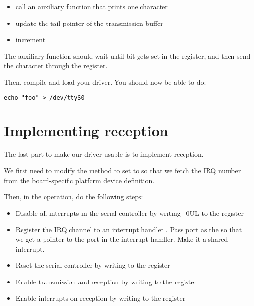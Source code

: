 \begin{itemize}
\item call an auxiliary function that prints one character
\item update the tail pointer of the transmission buffer
\item increment 
\end{itemize}

The auxiliary function should wait until bit 
gets set in the  register, and then send the
character through the  register.

Then, compile and load your driver. You should now be able to do:

\begin{verbatim}
echo "foo" > /dev/ttyS0
\end{verbatim}

\section{Implementing reception}

The last part to make our driver usable is to implement reception.

We first need to modify the  method to set
 to  so that we fetch
the IRQ number from the board-specific platform device definition.

Then, in the  operation, do the following steps:

\begin{itemize}

\item Disable all interrupts in the serial controller by writing ~0UL
  to the  register

\item Register the IRQ channel  to an interrupt handler
  . Pass port as the  so that we
  get a pointer to the port in the interrupt handler. Make it a shared
  interrupt.

\item Reset the serial controller by writing  to the  register

\item Enable transmission and reception by writing  to the  register

\item Enable interrupts on reception by writing  to
  the  register

\end{itemize}

